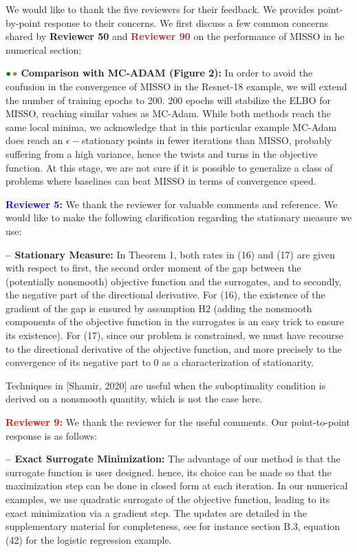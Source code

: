 \documentclass{article}
\begin{document}
We would like to thank the five reviewers for their feedback. We provides point-by-point response to their concerns.
We first discuss a few common concerns shared by \textbf{\textcolor{green!50!black}{Reviewer 50}} and \textbf{\textcolor{brown}{Reviewer 90}} on the performance of MISSO in he numerical section:

\vspace{0.03in}
${\color{green!50!black}\bullet}\!~{\color{brown}\bullet}$ \textbf{Comparison with MC-ADAM (Figure 2):} 
In order to avoid the confusion in the convergence of MISSO in the Resnet-18 example, we will extend the number of training epochs to 200.
200 epochs will stabilize the ELBO for MISSO, reaching similar values as MC-Adam.
While both methods reach the same local minima, we acknowledge that in this particular example MC-Adam does reach an $\epsilon-$stationary points in fewer iterations than MISSO, probably suffering from a high variance, hence the twists and turns in the objective function.
At this stage, we are not sure if it is possible to generalize a class of problems where baselines can beat MISSO in terms of convergence speed.

\medskip
\textbf{\textcolor{blue}{Reviewer 5:}} We thank the reviewer for valuable comments and reference. We would like to make the following clarification regarding the stationary measure we use: 

\vspace{0.03in}
\textbf{-- Stationary Measure:} In Theorem 1, both rates in (16) and (17) are given with respect to first, the second order moment of the gap between the (potentially nonsmooth) objective function and the surrogates, and to secondly, the negative part of the directional derivative.
For (16), the existence of the gradient of the gap is ensured by assumption H2 (adding the nonsmooth components of the objective function in the surrogates is an easy trick to ensure its existence).
For (17), since our problem is constrained, we must have recourse to the directional derivative of the objective function, and more precisely to the convergence of its negative part to $0$ as a characterization of stationarity.

Techniques in [Shamir, 2020] are useful when the suboptimality condition is derived on a nonsmooth quantity, which is not the case here.


\medskip
\textbf{\textcolor{red}{Reviewer 9:}} We thank the reviewer for the useful comments. Our point-to-point response is as follows: 

\vspace{0.03in}
\textbf{-- Exact Surrogate Minimization:} 
The advantage of our method is that the surrogate function is user designed.
hence, its choice can be made so that the maximization step can be done in closed form at each iteration.
In our numerical examples, we use quadratic surrogate of the objective function, leading to its exact minimization via a gradient step.
The updates are detailed in the supplementary material for completeness, see for instance section B.3, equation (42) for the logistic regression example.
\end{document}
